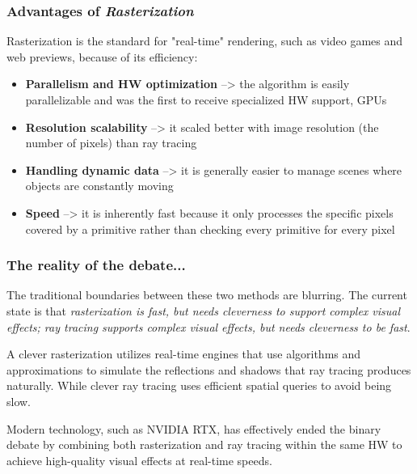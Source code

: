 \subsubsection{Advantages of \textit{Rasterization}}
Rasterization is the standard for "real-time" rendering, such as video games and web previews, because of its efficiency:
\begin{itemize}[noitemsep]
    \item \textbf{Parallelism and HW optimization} --> the algorithm is easily parallelizable and was the first to receive specialized HW support, GPUs
    \item \textbf{Resolution scalability} --> it scaled better with image resolution (the number of pixels) than ray tracing
    \item \textbf{Handling dynamic data} --> it is generally easier to manage scenes where objects are constantly moving
    \item \textbf{Speed} --> it is inherently fast because it only processes the specific pixels covered by a primitive rather than checking every primitive for every pixel
\end{itemize}

\subsubsection{The reality of the debate...}
The traditional boundaries between these two methods are blurring. The current state is that \textit{rasterization is fast, but needs cleverness to support complex visual effects; ray tracing supports complex visual effects, but needs cleverness to be fast}.\par
A clever rasterization utilizes real-time engines that use algorithms and approximations to simulate the reflections and shadows that ray tracing produces naturally. While clever ray tracing uses efficient spatial queries to avoid being slow. \par
Modern technology, such as NVIDIA RTX, has effectively ended the binary debate by combining both rasterization and ray tracing within the same HW to achieve high-quality visual effects at real-time speeds.